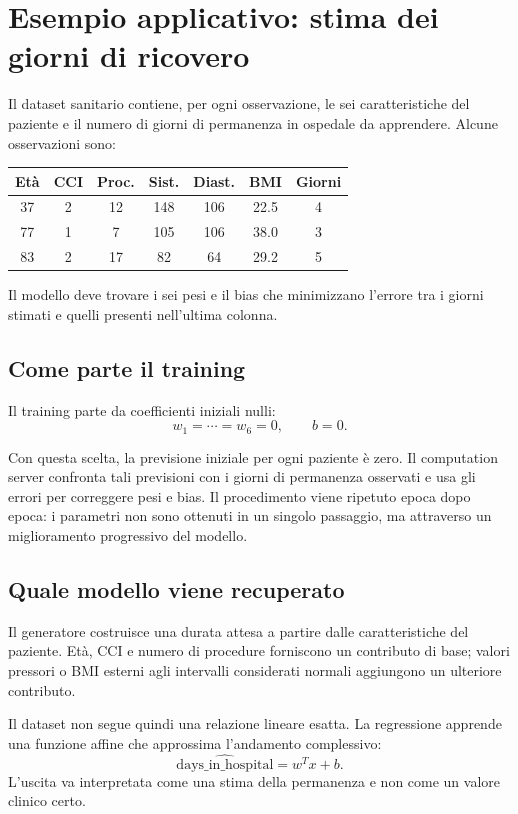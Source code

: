 \section{Esempio applicativo: stima dei giorni di ricovero}
Il dataset sanitario contiene, per ogni osservazione, le sei caratteristiche del paziente e il numero di giorni di permanenza in ospedale da apprendere. Alcune osservazioni sono:
\begin{center}
\begin{tabular}{|c|c|c|c|c|c|c|}
\hline
\textbf{Et\`a} & \textbf{CCI} & \textbf{Proc.} & \textbf{Sist.} &
\textbf{Diast.} & \textbf{BMI} & \textbf{Giorni} \\
\hline
37 & 2 & 12 & 148 & 106 & 22.5 & 4 \\
77 & 1 & 7 & 105 & 106 & 38.0 & 3 \\
83 & 2 & 17 & 82 & 64 & 29.2 & 5 \\
\hline
\end{tabular}
\end{center}

Il modello deve trovare i sei pesi e il bias che minimizzano l'errore tra i giorni stimati e quelli presenti nell'ultima colonna.

\subsection{Come parte il training}
Il training parte da coefficienti iniziali nulli:
\begin{equation}
w_1 = \cdots = w_6 = 0,
\qquad
b = 0.
\end{equation}

Con questa scelta, la previsione iniziale per ogni paziente \`e zero. Il computation server confronta tali previsioni con i giorni di permanenza osservati e usa gli errori per correggere pesi e bias. Il procedimento viene ripetuto epoca dopo epoca: i parametri non sono ottenuti in un singolo passaggio, ma attraverso un miglioramento progressivo del modello.

\subsection{Quale modello viene recuperato}
Il generatore costruisce una durata attesa a partire dalle caratteristiche del paziente. Et\`a, CCI e numero di procedure forniscono un contributo di base; valori pressori o BMI esterni agli intervalli considerati normali aggiungono un ulteriore contributo.

Il dataset non segue quindi una relazione lineare esatta. La regressione apprende una funzione affine che approssima l'andamento complessivo:
\begin{equation}
\widehat{\text{days\_in\_hospital}}=w^Tx+b.
\end{equation}
L'uscita va interpretata come una stima della permanenza e non come un valore clinico certo.

